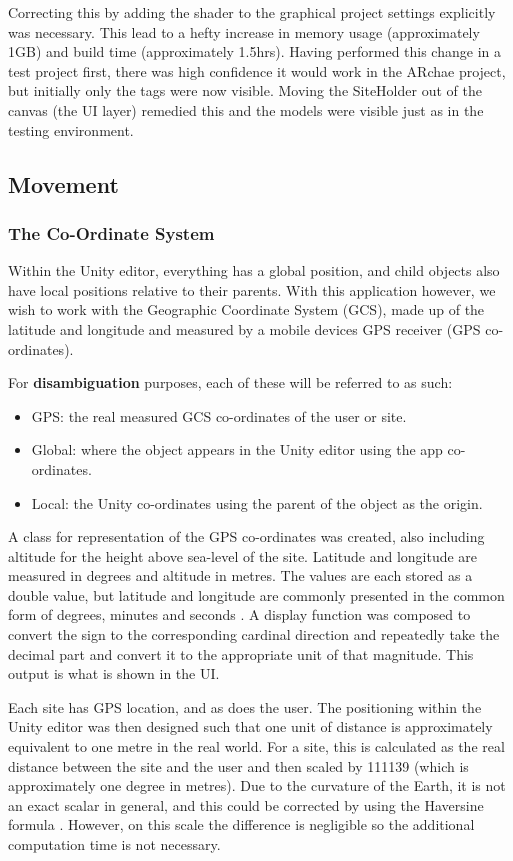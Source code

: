 \documentclass{article}
\begin{document}
Correcting this by adding the shader to the graphical project settings explicitly was necessary. This lead to a hefty increase in memory usage (approximately 1GB) and build time (approximately 1.5hrs). Having performed this change in a test project first, there was high confidence it would work in the ARchae project, but initially only the tags were now visible. Moving the SiteHolder out of the canvas (the UI layer) remedied this and the models were visible just as in the testing environment.

\subsection{Movement}
\label{movement}

\subsubsection{The Co-Ordinate System}
Within the Unity editor, everything has a global position, and child objects also have local positions relative to their parents. With this application however, we wish to work with the Geographic Coordinate System (GCS), made up of the latitude and longitude and measured by a mobile devices GPS receiver (GPS co-ordinates). 

For \textbf{disambiguation} purposes, each of these will be referred to as such:
\begin{itemize}
    \item GPS: the real measured GCS co-ordinates of the user or site.
    \item Global: where the object appears in the Unity editor using the app co-ordinates.
    \item Local: the Unity co-ordinates using the parent of the object as the origin.
\end{itemize}

A class for representation of the GPS co-ordinates was created, also including altitude for the height above sea-level of the site. Latitude and longitude are measured in degrees and altitude in metres. The values are each stored as a double value, but latitude and longitude are commonly presented in the common form of degrees, minutes and seconds \cite{movement:latitudelongitude}. A display function was composed to convert the sign to the corresponding cardinal direction and repeatedly take the decimal part and convert it to the appropriate unit of that magnitude. This output is what is shown in the UI.

Each site has GPS location, and as does the user. The positioning within the Unity editor was then designed such that one unit of distance is approximately equivalent to one metre in the real world. For a site, this is calculated as the real distance between the site and the user and then scaled by 111139 (which is approximately one degree in metres). Due to the curvature of the Earth, it is not an exact scalar in general, and this could be corrected by using the Haversine formula \cite{movement:haversine}. However, on this scale the difference is negligible so the additional computation time is not necessary.
\end{document}
